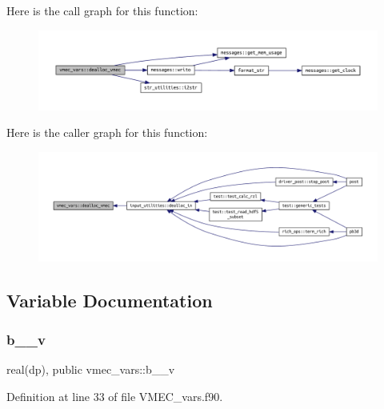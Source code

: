 Here is the call graph for this function\+:
\nopagebreak
\begin{figure}[H]
\begin{center}
\leavevmode
\includegraphics[width=350pt]{namespacevmec__vars_ace63f2f143043b860f7705dff7089676_cgraph}
\end{center}
\end{figure}
Here is the caller graph for this function\+:
\nopagebreak
\begin{figure}[H]
\begin{center}
\leavevmode
\includegraphics[width=350pt]{namespacevmec__vars_ace63f2f143043b860f7705dff7089676_icgraph}
\end{center}
\end{figure}


\subsection{Variable Documentation}
\mbox{\label{namespacevmec__vars_a71e1a738f0e423fe6c284f8ea636008e}} 
\subsubsection{\texorpdfstring{b\+\_\+\_\+v}{b\_0\_v}}
{\footnotesize\ttfamily real(dp), public vmec\+\_\+vars\+::b\+\_\+\_\+v}



Definition at line 33 of file V\+M\+E\+C\+\_\+vars.\+f90.

\mbox{\label{namespacevmec__vars_ad6833cc726863147b8fed188d3a28f5d}} 

